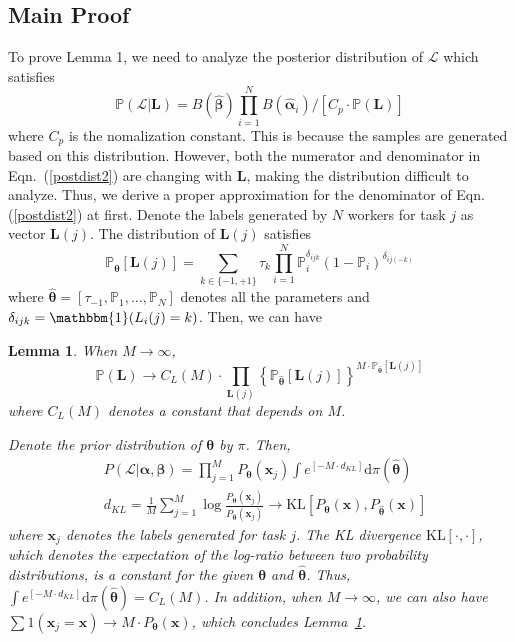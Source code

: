 \documentclass{article}
\makeatletter
\newcounter{lemmas}
\newtheorem{lemma}[lemmas]{Lemma}
\renewenvironment{proof}[1][\proofname]{\par
  \vspace{-\topsep}%
  \pushQED{\qed}%
  \normalfont
  \topsep0pt \partopsep0pt %
  \trivlist
  \item[\hskip\labelsep
        \itshape
    #1\@addpunct{.}]\ignorespaces
}{%
  \popQED\endtrivlist\@endpefalse
  \addvspace{0pt plus 0pt} %
}
\makeatother
\begin{document}
\subsection{Main Proof}
To prove Lemma 1, we need to analyze the posterior distribution of $\mathcal{L}$ which satisfies
\begin{equation}
\label{postdist2}
\mathbb P(\mathcal{L}|\bm{L})=B(\hat{\bm{\beta}}){\prod}_{i=1}^{N}B(\hat{\bm{\alpha}}_{i})/[C_p\cdot \mathbb P(\bm{L})]
\end{equation}
where $C_p$ is the nomalization constant.
This is because the samples are generated based on this distribution.
However, both the numerator and denominator in Eqn.~(\ref{postdist2}) are changing with $\bm{L}$, making the distribution difficult to analyze.
Thus, we derive a proper approximation for the denominator of Eqn. (\ref{postdist2}) at first.
Denote the labels generated by $N$ workers for task $j$ as vector $\bm{L}(j)$.
The distribution of $\bm{L}(j)$ satisfies
\begin{equation}
\mathbb{P}_{\hat{\bm{\theta}}}[\bm{L}(j)] = {\sum}_{k\in\{-1,+1\}}\tau_k{\prod}_{i=1}^{N}\mathbb{P}_i^{\delta_{ijk}}(1-\mathbb{P}_i)^{\delta_{ij(-k)}}
\end{equation}
where $\hat{\bm{\theta}}=[\tau_{-1}, \mathbb{P}_1,\ldots,\mathbb{P}_N]$ denotes all the parameters and $\delta_{ijk}=\mathbbm{1}(L_i(j)=k)$.
Then, we can have
\begin{lemma}
\label{Denominator}
When $M\rightarrow \infty$, 
\begin{equation*}
\mathbb{P}(\bm{L})\rightarrow C_{L}(M) \cdot {\prod}_{\bm{L}(j)} \left\{\mathbb{P}_{\hat{\bm{\theta}}}[\bm{L}(j)]\right\}^{M\cdot \mathbb{P}_{\hat{\bm{\theta}}}[\bm{L}(j)]}
\end{equation*}
where $C_{L}(M)$ denotes a constant that depends on $M$.
\begin{proof}
Denote the prior distribution of $\bm{\theta}$ by $\pi$. Then,
\begin{align}
&P(\mathcal{L}|\bm{\alpha}, \bm{\beta})= {\prod}_{j=1}^{M}P_{\bm{\theta}}(\bm{x}_j) \int e^{[-M\cdot d_{KL}]} \mathrm{d}\pi(\hat{\bm{\theta}})\\
&d_{KL}=\frac{1}{M}\sum_{j=1}^{M}\log \frac{P_{\bm{\theta}}(\bm{x}_j)}{P_{\bm{\hat{\theta}}}(\bm{x}_j)}\rightarrow \mathrm{KL}[P_{\bm{\theta}}(\bm{x}),P_{\bm{\hat{\theta}}}(\bm{x})]
\end{align}
where $\bm{x}_j$ denotes the labels generated for task $j$. The KL divergence $\mathrm{KL}[\cdot, \cdot]$, which denotes the expectation of the log-ratio between two probability distributions, is a constant for the given $\bm{\theta}$ and $\hat{\bm{\theta}}$.
Thus, $\int e^{[-M\cdot d_{KL}]} \mathrm{d}\pi(\hat{\bm{\theta}})=C_{L}(M)$.
In addition, when $M\rightarrow \infty$, we can also have $\sum 1(\bm{x}_j=\bm{x})\rightarrow M \cdot P_{\bm{\theta}}(\bm{x})$, which concludes Lemma~\ref{Denominator}.
\end{proof}
\end{lemma}
\end{document}
